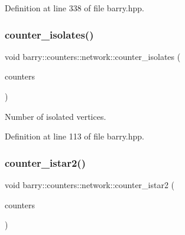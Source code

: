 Definition at line 338 of file barry.\+hpp.

\mbox{\label{namespacebarry_1_1counters_1_1network_a16449353394312feed59aa5444d17dad}} 
\subsubsection{\texorpdfstring{counter\+\_\+isolates()}{counter\_isolates()}}
{\footnotesize\ttfamily void barry\+::counters\+::network\+::counter\+\_\+isolates (\begin{DoxyParamCaption}\item[{\hyperlink{namespacebarry_1_1counters_1_1network_a3b3c590303d47840d1967372ae495d95}{Net\+Counter\+Vector} $\ast$}]{counters }\end{DoxyParamCaption})\hspace{0.3cm}{\ttfamily [inline]}}



Number of isolated vertices. 



Definition at line 113 of file barry.\+hpp.

\mbox{\label{namespacebarry_1_1counters_1_1network_a95eea8464d85c595efa305cdf9a5a82b}} 
\subsubsection{\texorpdfstring{counter\+\_\+istar2()}{counter\_istar2()}}
{\footnotesize\ttfamily void barry\+::counters\+::network\+::counter\+\_\+istar2 (\begin{DoxyParamCaption}\item[{\hyperlink{namespacebarry_1_1counters_1_1network_a3b3c590303d47840d1967372ae495d95}{Net\+Counter\+Vector} $\ast$}]{counters }\end{DoxyParamCaption})\hspace{0.3cm}{\ttfamily [inline]}}



